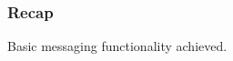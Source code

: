 \documentclass[
	aspectratio=169,
	xetex,
]{beamer}
\newcounter{i}
\begin{document}



\begin{frame}
	\frametitle{Recap}
	Basic messaging functionality achieved.
\end{frame}
\end{document}
